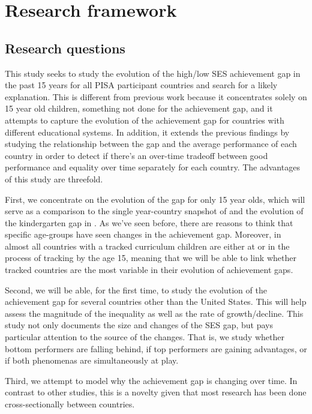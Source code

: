 \documentclass[11pt, a4paper]{article}\usepackage[]{graphicx}\usepackage[]{color}
\begin{document}
\section{Research framework}

\subsection{Research questions}

This study seeks to study the evolution of the high/low SES achievement gap in the past 15 years for all PISA participant countries and search for a likely explanation. This is different from previous work because it concentrates solely on 15 year old children, something not done for the achievement gap, and it attempts to capture the evolution of the achievement gap for countries with different educational systems. In addition, it extends the previous findings by studying the relationship between the gap and the average performance of each country in order to detect if there's an over-time tradeoff between good performance and equality over time separately for each country. The advantages of this study are threefold.

First, we concentrate on the evolution of the gap for only 15 year olds, which will serve as a comparison to the single year-country snapshot of \citet{anna2016} and the evolution of the kindergarten gap in \citet{reardon_portilla}. As we've seen before, there are reasons to think that specific age-groups have seen changes in the achievement gap. Moreover, in almost all countries with a tracked curriculum children are either at or in the process of tracking by the age 15, meaning that we will be able to link whether tracked countries are the most variable in their evolution of achievement gaps.

Second, we will be able, for the first time, to study the evolution of the achievement gap for several countries other than the United States. This will help assess the magnitude of the inequality as well as the rate of growth/decline. This study not only documents the size and changes of the SES gap, but pays particular attention to the source of the changes. That is, we study whether bottom performers are falling behind, if top performers are gaining advantages, or if both phenomenas are simultaneously at play.

Third, we attempt to model why the achievement gap is changing over time. In contrast to other studies, this is a novelty given that most research has been done cross-sectionally between countries.
\end{document}

